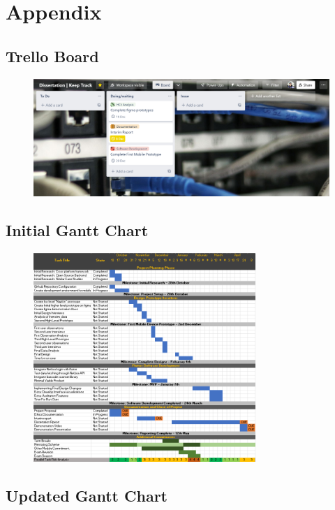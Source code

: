 \documentclass [11pt,a4paper]{article}
\begin{document}
\appendix
\section{Appendix}
\label{sec:appendix}
\subsection{Trello Board}
\label{sec:trello_board}
\begin{figure}[H]
    \centering
    \includegraphics[width=.75\textwidth]{images/trello-board.png}
\end{figure}   

\subsection{Initial Gantt Chart}
\label{sec:init_gantt_charts}
\begin{figure}[H]
    \centering
    \includegraphics[width=0.75\textwidth]{images/keeptrack-gantt-initial.png}
    \label{fig:initialworkplan}
\end{figure}

\subsection{Updated Gantt Chart}
\label{sec:updated_gantt_charts}
\end{document}
